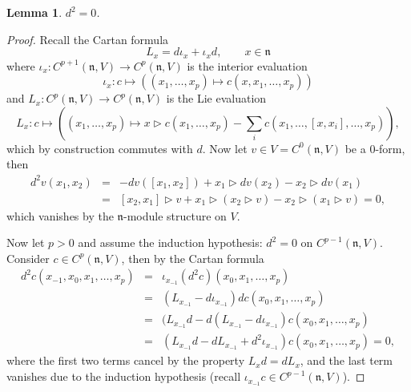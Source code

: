 \documentclass[onecolumn]{article}
\theoremstyle{theorem}
\newtheorem{lemma}{Lemma}[section]
\theoremstyle{remark}
\theoremstyle{example}
\theoremstyle{definition}
\numberwithin{equation}{section}
\begin{document}
\begin{lemma}
$d^2=0$.
\end{lemma}
\begin{proof}
Recall the { {Cartan formula}}
\begin{equation}
    L_x = d\iota_x + \iota_x d,\qquad x\in\mathfrak{n}\nonumber
\end{equation}
where $\iota_x:C^{p+1}(\mathfrak{n},V)\rightarrow C^p(\mathfrak{n},V)$ is the interior evaluation
\begin{equation}
    \iota_x:c \mapsto ((x_1,\dots,x_p)\mapsto c(x,x_1,\dots,x_p)) \nonumber
\end{equation}
and $L_x: C^p(\mathfrak{n},V)\rightarrow C^p(\mathfrak{n},V)$ is the Lie evaluation
\begin{equation}
    L_x:c\mapsto ((x_1,\dots,x_p)\mapsto x\rhd c(x_1,\dots,x_p) - \sum_i c(x_1,\dots,[x,x_i],\dots,x_p)),\nonumber
\end{equation}
which by construction commutes with $d$. Now let $v\in V = C^0(\mathfrak{n},V)$ be a 0-form, then
\begin{eqnarray}
    d^2v(x_1,x_2) &=& -dv([x_1,x_2]) + x_1\rhd dv(x_2) - x_2\rhd dv(x_1) \nonumber \\
    &=& [x_2,x_1]\rhd v + x_1\rhd (x_2 \rhd v) - x_2\rhd (x_1\rhd v) = 0,\nonumber
\end{eqnarray}
which vanishes by the $\mathfrak{n}$-module structure on $V$. 

Now let $p>0$ and assume the induction hypothesis: $d^2=0$ on $C^{p-1}(\mathfrak{n},V)$. Consider $c\in C^p(\mathfrak{n},V)$, then by the Cartan formula
\begin{eqnarray}
    d^2c(x_{-1},x_0,x_1,\dots,x_p) &=& \iota_{x_{-1}}(d^2c)(x_0,x_1,\dots,x_p) \nonumber\\
    &=& (L_{x_{-1}} - d\iota_{x_{-1}})dc(x_0,x_1,\dots,x_p) \nonumber \\
    &=& (L_{x_{-1}}d - d(L_{x_{-1}} - d\iota_{x_{-1}})c(x_0,x_1,\dots,x_p) \nonumber \\
    &=& (L_{x_{-1}}d - dL_{x_{-1}} + d^2\iota_{x_{-1}})c(x_0,x_1,\dots,x_p) = 0,\nonumber
\end{eqnarray}
where the first two terms cancel by the property $L_xd=dL_x$, and the last term vanishes due to the induction hypothesis (recall $\iota_{x_{-1}}c\in C^{p-1}(\mathfrak{n},V)$).
\end{proof}
\end{document}
